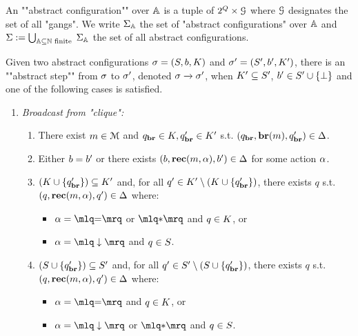 \begin{definition}
\label{def:abstract-configuration}
An ""abstract configuration"" over $\mathbb{A}$ is a tuple of $2^Q \times \mathcal{G}$ where $\mathcal{G}$ designates the set of all "gangs". We write $\Sigma_{\mathbb{A}}$ the set of "abstract configurations" over $\mathbb{A}$ and $\Sigma := \bigcup_{\mathbb{A} \subseteq \mathbb{N} \text{ finite }}\Sigma_{\mathbb{A}}$ the set of all abstract configurations. 

Given two abstract configurations $\aconfig = (\covset, \boss, \clique)$ and $\aconfig' = (\covset', \boss', \clique')$, there is an ""abstract step"" from $\sigma$ to $\sigma'$, denoted $\sigma \xrightarrow{} \sigma'$, when $\clique' \subseteq \covset'$, $\boss' \in \covset' \cup \set{\noboss}$ and one of the following cases is satisfied.
\begin{enumerate}
\item \emph{Broadcast from "clique":}
	\begin{enumerate}[i]
		\item\label{item:broadcast_from_clique_broadcast} There exist $m \in \mathcal{M}$ and $\statebr \in \clique, \statebr' \in \clique'$ s.t. $(q_{\textbf{br}}, \textbf{br}(m), q_{\textbf{br}}') \in \Delta$. 
		
		\item\label{item:broadcast_from_clique_boss} Either $\boss = \boss'$ or there exists $(\boss, \recone{\amessage}{\anact}, \boss') \in \transitions$ for some action $\alpha$.

		\item\label{item:broadcast_from_clique_clique}$(\clique \cup \set{\statebr'}) \subseteq \clique'$ and, for all $q' \in \clique' \setminus (\clique \cup \set{\statebr'})$, there exists $q$ s.t. $(q, \textbf{rec}(m, \alpha), q') \in \Delta$ where:
		\begin{itemize}
			\item $\anact = \quotemarks{\eqtestact}$ or $\quotemarks{\dummyact}$ and $q \in \clique$, or
			\item $\anact= \quotemarks{\enregact}$ and $q \in S$.
		\end{itemize}
		
		\item\label{item:broadcast_from_clique_covset}$(S \cup \{q_{\textbf{br}}'\}) \subseteq S'$ and, for all $q' \in S' \setminus (S \cup \{q_{\textbf{br}}'\})$, there exists $q$ s.t. $(q, \textbf{rec}(m, \alpha), q') \in \Delta$ where:
		\begin{itemize}
			\item  $\anact = \quotemarks{\eqtestact}$ and $q \in \clique$, or
			\item $\anact = \quotemarks{\enregact}$ or $\quotemarks{\dummyact}$ and $q \in S$.
		\end{itemize}
	\end{enumerate}



\end{enumerate}
\end{definition}
